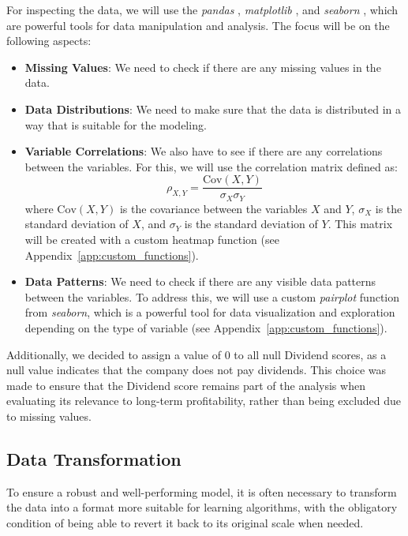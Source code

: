 \documentclass[11pt,english,a4paper,hidelinks]{book}
\begin{document}
\vspace{0.5cm}
\noindent For inspecting the data, we will use the \textit{pandas} \cite{pandas2024}, \textit{matplotlib} \cite{matplotlib2025doc}, and \textit{seaborn} \cite{seaborn2024}, which are powerful tools for data manipulation and analysis. The focus will be on the following aspects:
\begin{itemize}
  \item \textbf{Missing Values}: We need to check if there are any missing values in the data.
  \item \textbf{Data Distributions}: We need to make sure that the data is distributed in a way that is suitable for the modeling.
  \item \textbf{Variable Correlations}: We also have to see if there are any correlations between the variables. For this, we will use the correlation matrix defined as:
  \begin{equation}
    \rho_{X,Y} = \frac{\text{Cov}(X,Y)}{\sigma_X \sigma_Y}
  \end{equation}
  where \(\text{Cov}(X,Y)\) is the covariance between the variables \(X\) and \(Y\), \(\sigma_X\) is the standard deviation of \(X\), and \(\sigma_Y\) is the standard deviation of \(Y\). This matrix will be created with a custom heatmap function (see Appendix~\ref{app:custom_functions}).
  \item \textbf{Data Patterns}: We need to check if there are any visible data patterns between the variables. To address this, we will use a custom \textit{pairplot} function from \textit{seaborn}, which is a powerful tool for data visualization and exploration  depending on the type of variable (see Appendix~\ref{app:custom_functions}).
\end{itemize}

\vspace{0.5cm}
\noindent Additionally, we decided to assign a value of 0 to all null Dividend scores, as a null value indicates that the company does not pay dividends. This choice was made to ensure that the Dividend score remains part of the analysis when evaluating its relevance to long-term profitability, rather than being excluded due to missing values.


\subsection{Data Transformation}

To ensure a robust and well-performing model, it is often necessary to transform the data into a format more suitable for learning algorithms, with the obligatory condition of being able to revert it back to its original scale when needed. 
\end{document}
